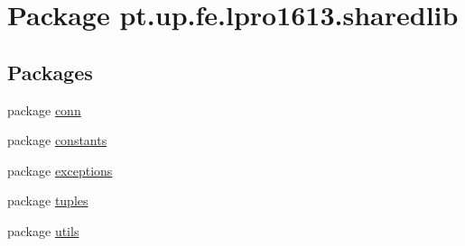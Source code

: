 \hypertarget{namespacept_1_1up_1_1fe_1_1lpro1613_1_1sharedlib}{}\section{Package pt.\+up.\+fe.\+lpro1613.\+sharedlib}
\label{namespacept_1_1up_1_1fe_1_1lpro1613_1_1sharedlib}
\subsection*{Packages}
\begin{DoxyCompactItemize}
\item 
package \hyperlink{namespacept_1_1up_1_1fe_1_1lpro1613_1_1sharedlib_1_1conn}{conn}
\item 
package \hyperlink{namespacept_1_1up_1_1fe_1_1lpro1613_1_1sharedlib_1_1constants}{constants}
\item 
package \hyperlink{namespacept_1_1up_1_1fe_1_1lpro1613_1_1sharedlib_1_1exceptions}{exceptions}
\item 
package \hyperlink{namespacept_1_1up_1_1fe_1_1lpro1613_1_1sharedlib_1_1tuples}{tuples}
\item 
package \hyperlink{namespacept_1_1up_1_1fe_1_1lpro1613_1_1sharedlib_1_1utils}{utils}
\end{DoxyCompactItemize}
